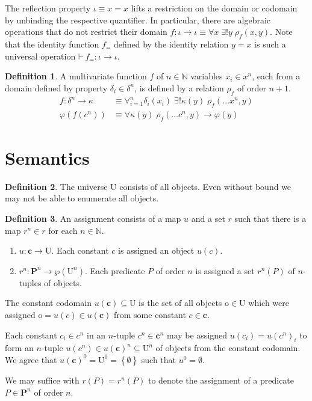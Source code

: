 \documentclass{amsbook}
\newcommand{\setsm}[1]{\left\{#1\right\}}
\newcommand{\theorem}{\mathord\vdash\medspace}
\newcommand{\univ}[1]{\mathord\forall#1\;}
\newcommand{\exis}[1]{\mathord\exists#1\;}
\newcommand{\then}{\mathrel\rightarrow}
\theoremstyle{definition}
\newtheorem{dfn}{Definition}[section]
\begin{document}
The reflection property $\iota \equiv x = x$ lifts a restriction on the domain or codomain by unbinding the respective quantifier. In particular, there are algebraic operations that do not restrict their domain $f: \iota \longrightarrow \iota \equiv \univ x \exis{!y} \rho_f(x, y)$. Note that the identity function $f_{\mathord=}$ defined by the identity relation $y = x$ is such a universal operation $\theorem f_{\mathord=}: \iota \longrightarrow \iota$.

\begin{dfn}
    A multivariate function $f$ of $n \in \mathbb N$ variables $x_i \in x^n$, each from a domain defined by property $\delta_i \in \delta^n$, is defined by a relation $\rho_f$ of order $n+1$.
    $$\begin{aligned}
            f: \delta^n \longrightarrow \kappa & \equiv \forall_{i=1}^n{\delta_i(x_i)}\; \exis{!\kappa(y)} \rho_f(\dots x^n, y) \\
            \varphi(f(c^n))                    & \equiv \univ{\kappa(y)} \rho_f(\dots c^n, y) \then \varphi(y)
        \end{aligned}$$
\end{dfn}

\section{Semantics}

\begin{dfn}
    The universe $\mathrm U$ consists of all objects. Even without bound we may not be able to enumerate all objects.
\end{dfn}

\begin{dfn}
    An assignment consists of a map $u$ and a set $r$ such that there is a map $r^n \in r$ for each $n \in \mathbb N$.
    \begin{enumerate}
        \item $u: \mathbf c \longrightarrow \mathrm U$.
              Each constant $c$ is assigned an object $u(c)$.
        \item $r^n: \mathbf P^n \longrightarrow \wp(\mathrm U^n)$.
              Each predicate $P$ of order $n$ is assigned a set $r^n(P)$ of $n$-tuples of objects.
    \end{enumerate}

    The constant codomain $u(\mathbf c) \subseteq \mathrm U$ is the set of all objects $\mathrm o \in \mathrm U$ which were assigned $\mathrm o = u(c) \in u(\mathbf c)$ from some constant $c \in \mathbf c$.

    Each constant $c_i \in c^n$ in an $n$-tuple $c^n \in \mathbf c^n$ may be assigned $u(c_i) = u(c^n)_i$ to form an $n$-tuple $u(c^n) \in u(\mathbf c)^n \subseteq \mathrm U^n$ of objects from the constant codomain. We agree that $u(\mathbf c)^0 = \mathrm U^0 = \setsm{\emptyset}$ such that $u^0 = \emptyset$.

    We may suffice with $r(P) = r^n(P)$ to denote the assignment of a predicate $P \in \mathbf P^n$ of order $n$.
\end{dfn}
\end{document}
